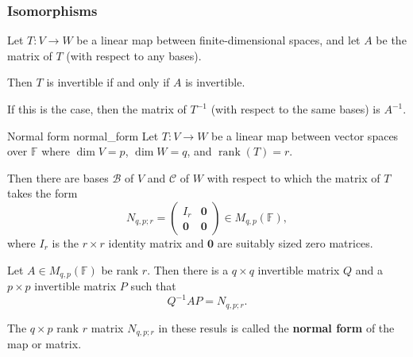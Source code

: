 \subsubsection{Isomorphisms}

\begin{theorem}{\cite{math2601_notes}}{}
	Let $T : V \to W$ be a linear map between finite-dimensional spaces, and let $A$ be the matrix of $T$ (with respect to any bases).

	Then $T$ is invertible if and only if $A$ is invertible.

	If this is the case, then the matrix of $T^{-1}$ (with respect to the same bases) is $A^{-1}$.
\end{theorem}

\begin{theorem}{Normal form \cite{math2601_notes}}{normal_form}
	Let $T : V \to W$ be a linear map between vector spaces over $\mathbb{F}$ where $\dim V = p$, $\dim W = q$, and $\operatorname{rank}(T) = r$.

	Then there are bases $\mathcal{B}$ of $V$ and $\mathcal{C}$ of $W$ with respect to which the matrix of $T$ takes the form
	$$
		N_{q,p;r} =
		\begin{pmatrix}
			I_r & \mathbf{0} \\
			\mathbf{0} & \mathbf{0}
		\end{pmatrix}
		\in M_{q,p} (\mathbb{F}) ,
	$$
	where $I_r$ is the $r \times r$ identity matrix and $\mathbf{0}$ are suitably sized zero matrices.
\end{theorem}

\begin{corollary}{\cite{math2601_notes}}{}
	Let $A \in M_{q,p} (\mathbb{F})$ be rank $r$. Then there is a $q \times q$ invertible matrix $Q$ and a $p \times p$ invertible matrix $P$ such that
	$$ Q^{-1} A P = N_{q,p;r} . $$
\end{corollary}

The $q \times p$ rank $r$ matrix $N_{q,p;r}$ in these resuls is called the \textbf{normal form} of the map or matrix.